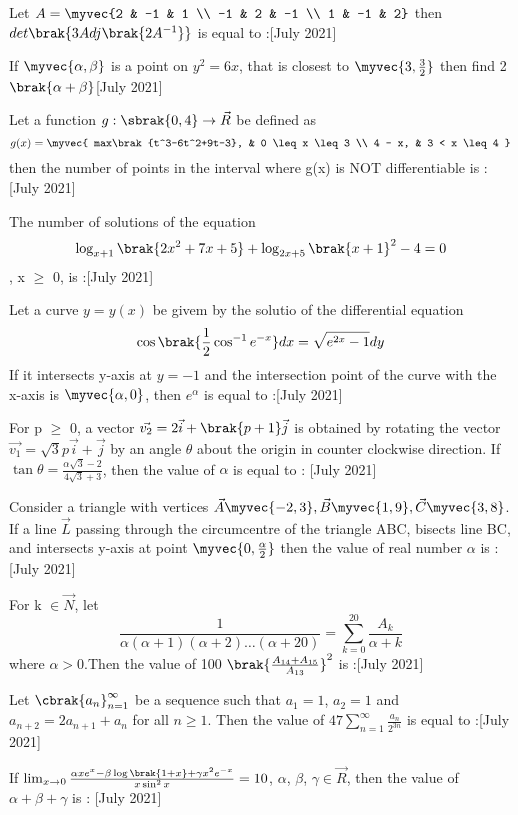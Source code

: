\iffalse
\title{2021}
\author{EE24BTECH11012}
\section{integer}
\fi
	\item Let $ A = \myvec{2 & -1 & 1 \\ -1 & 2 & -1 \\ 1 & -1 & 2}$ then $det\brak{3Adj\brak{2A^{-1}}}$ is equal to :\hfill{[July 2021]}
	\item If $\myvec{\alpha , \beta}$ is a point on $y^2=6x$, that is closest to $\myvec{3,\frac{3}{2}}$ then find 2 $ \brak{\alpha+\beta} $\hfill{[July 2021]}

	\item Let a function  $g : \sbrak{0,4} \rightarrow \vec{R}$ be defined as
		$$ g(x) = \myvec{ max\brak{t^3-6t^2+9t-3}, & 0 \leq x \leq 3 \\
		                  4 - x, & 3 < x \leq 4 } $$
			then the number of points in the interval  where g(x) is NOT differentiable is :\hfill{[July 2021]}
		\item The number of solutions of the equation $$\log_{x+1}{\brak{2x^2+7x+5}} + \log_{2x+5}{\brak{x+1}^2} - 4 = 0$$, x $\geq$ 0, is :\hfill{[July 2021]}

	\item Let a curve $ y = y(x)$ be givem by the solutio of the differential equation $$\cos{\brak{\frac{1}{2}\cos^{-1}{e^{-x}}}} dx = \sqrt{e^{2x} - 1} dy $$If it intersects y-axis at $y=-1$ and the intersection point of the curve with the x-axis is $\myvec{\alpha , 0}$, then $e^{\alpha}$ is equal to :\hfill{[July 2021]}
	\item For p $\geq$ 0, a vector $\vec{v_2} = 2\vec{i} + \brak{p+1}\vec{j}$ is obtained by rotating the vector $\vec{v_1} = \sqrt{3}p\vec{i} + \vec{j}$ by an angle $\theta$ about the origin in counter clockwise direction. If $\tan{\theta} = \frac{\alpha\sqrt{3} - 2}{4\sqrt{3} + 3}$, then the value of $\alpha$ is equal to : \hfill{[July 2021]}
	\item Consider a triangle with vertices $\vec{A} \myvec{-2,3}, \vec{B} \myvec{1,9}, \vec{C} \myvec{3,8}$. If a line $\vec{L}$ passing through the circumcentre of the triangle ABC, bisects line BC, and intersects y-axis at point $\myvec{0,\frac{\alpha}{2}}$ then the value of real number $\alpha$ is :\hfill{[July 2021]}
	\item For k $\in \vec{N}$, let $$ \frac{1}{\alpha(\alpha +1)(\alpha +2)\dots(\alpha +20)} = \sum_{k=0}^{20} \frac{A_k}{\alpha + k} $$ where $\alpha>0$.Then the value of 100 $\brak{\frac{A_{14} + A_{15}}{A_{13}}}^2 $ is :\hfill{[July 2021]}
	\item Let $\cbrak{a_{n}}_{n=1}^{\infty}$ be a sequence such that $a_1 = 1$, $a_2 = 1$ and $a_{n+2} = 2a_{n+1} + a_{n}$ for all $n \geq 1$. Then the value of $47 \sum_{n=1}^{\infty} \frac{a_{n}}{2^{3n}}$ is equal to :\hfill{[July 2021]}
	\item If $\lim_{x \to 0} \frac{\alpha xe^{x} - \beta \log\brak{1+x} + \gamma x^2e^{-x}}{x \sin^{2}{x}} = 10 $, $\alpha$, $\beta$, $\gamma \in \vec{R}$, then the value of $\alpha + \beta + \gamma$ is : \hfill{[July 2021]}
%
